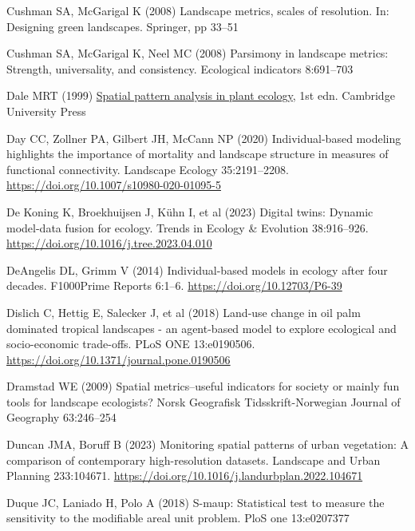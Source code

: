 \documentclass[
  10pt,
  a4paperpaper,
]{article}
\newlength{\cslhangindent}
\newenvironment{CSLReferences}[2] %
 {\begin{list}{}{%
  \setlength{\itemindent}{0pt}
  \setlength{\leftmargin}{0pt}
  \setlength{\parsep}{0pt}
  \ifodd #1
   \setlength{\leftmargin}{\cslhangindent}
   \setlength{\itemindent}{-1\cslhangindent}
  \fi
  \setlength{\itemsep}{#2\baselineskip}}}
 {\end{list}}
\begin{document}
\begin{CSLReferences}{1}{1}
Cushman SA, McGarigal K (2008) Landscape metrics, scales of resolution.
In: Designing green landscapes. Springer, pp 33--51

Cushman SA, McGarigal K, Neel MC (2008) Parsimony in landscape metrics:
Strength, universality, and consistency. Ecological indicators
8:691--703

Dale MRT (1999) \href{https://doi.org/10.1017/CBO9780511612589}{Spatial
pattern analysis in plant ecology}, 1st edn. Cambridge University Press

Day CC, Zollner PA, Gilbert JH, McCann NP (2020) Individual-based
modeling highlights the importance of mortality and landscape structure
in measures of functional connectivity. Landscape Ecology 35:2191--2208.
\url{https://doi.org/10.1007/s10980-020-01095-5}

De Koning K, Broekhuijsen J, Kühn I, et al (2023) Digital twins: Dynamic
model-data fusion for ecology. Trends in Ecology \& Evolution
38:916--926. \url{https://doi.org/10.1016/j.tree.2023.04.010}

DeAngelis DL, Grimm V (2014) Individual-based models in ecology after
four decades. F1000Prime Reports 6:1--6.
\url{https://doi.org/10.12703/P6-39}

Dislich C, Hettig E, Salecker J, et al (2018) Land-use change in oil
palm dominated tropical landscapes - an agent-based model to explore
ecological and socio-economic trade-offs. PLoS ONE 13:e0190506.
\url{https://doi.org/10.1371/journal.pone.0190506}

Dramstad WE (2009) Spatial metrics--useful indicators for society or
mainly fun tools for landscape ecologists? Norsk Geografisk
Tidsskrift-Norwegian Journal of Geography 63:246--254

Duncan JMA, Boruff B (2023) Monitoring spatial patterns of urban
vegetation: A comparison of contemporary high-resolution datasets.
Landscape and Urban Planning 233:104671.
\url{https://doi.org/10.1016/j.landurbplan.2022.104671}

Duque JC, Laniado H, Polo A (2018) S-maup: Statistical test to measure
the sensitivity to the modifiable areal unit problem. PloS one
13:e0207377


\end{CSLReferences}
\end{document}
